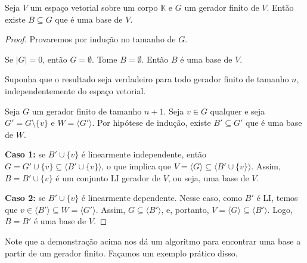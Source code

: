 \begin{proposition}
    Seja $V$ um espaço vetorial sobre um corpo $\mathbb K$ e $G$ um gerador finito de $V$.
    Então existe $B \subseteq G$ que é uma base de $V$.
\end{proposition}
\begin{proof}
    Provaremos por indução no tamanho de $G$.

    Se $|G|=0$, então $G=\emptyset$.
    Tome $B=\emptyset$. Então $B$ é uma base de $V$.

    Suponha que o resultado seja verdadeiro para todo gerador finito de tamanho $n$, independentemente do espaço vetorial.

    Seja $G$ um gerador finito de tamanho $n+1$.
    Seja $v \in G$ qualquer e seja $G' = G \setminus \{v\}$ e $W=\langle G'\rangle$.
    Por hipótese de indução, existe $B' \subseteq G'$ que é uma base de $W$.

    \textbf{Caso 1:} se $B'\cup \{v\}$ é linearmente independente, então $G=G'\cup\{v\}\subseteq \langle B'\cup\{v\}\rangle$, o que implica que $V=\langle G\rangle\subseteq \langle B'\cup\{v\}\rangle$.
    Assim, $B=B'\cup\{v\}$ é um conjunto LI gerador de $V$, ou seja, uma base de $V$.

    \textbf{Caso 2:} se $B'\cup \{v\}$ é linearmente dependente.
    Nesse caso, como $B'$ é LI, temos que $v \in \langle B'\rangle \subseteq W = \langle G'\rangle$.
    Assim, $G\subseteq \langle B'\rangle$, e, portanto, $V=\langle G\rangle \subseteq \langle B'\rangle$.
    Logo, $B=B'$ é uma base de $V$.
\end{proof}

Note que a demonstração acima nos dá um algoritmo para encontrar uma base a partir de um gerador finito.
Façamos um exemplo prático disso.

